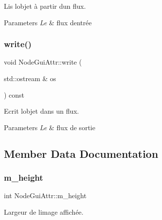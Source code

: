 Lis l\textquotesingle{}objet à partir d\textquotesingle{}un flux. 


\begin{DoxyParams}{Parameters}
{\em Le} & flux d\textquotesingle{}entrée \\
\hline
\end{DoxyParams}
\mbox{\label{struct_node_gui_attr_aabc33d777e16fd3640cf224edd4e0f9f}} 
\subsubsection{\texorpdfstring{write()}{write()}}
{\footnotesize\ttfamily void Node\+Gui\+Attr\+::write (\begin{DoxyParamCaption}\item[{std\+::ostream \&}]{os }\end{DoxyParamCaption}) const\hspace{0.3cm}{\ttfamily [inline]}}



Ecrit l\textquotesingle{}objet dans un flux. 


\begin{DoxyParams}{Parameters}
{\em Le} & flux de sortie \\
\hline
\end{DoxyParams}


\subsection{Member Data Documentation}
\mbox{\label{struct_node_gui_attr_aad75cafcb74b64f13842efc6b3c755d1}} 
\subsubsection{\texorpdfstring{m\+\_\+height}{m\_height}}
{\footnotesize\ttfamily int Node\+Gui\+Attr\+::m\+\_\+height}



Largeur de l\textquotesingle{}image affichée. 

\mbox{\label{struct_node_gui_attr_ae8361faefecd978e2a749e0e838af86b}} 
